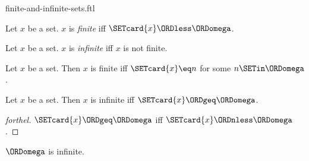 \documentclass{stex}
\begin{document}
\begin{smodule}{finite-and-infinite-sets.ftl}

\begin{definition}[forthel,id=SET_THEORY_07_5346658235711488]
  Let $x$ be a set.
  $x$ is \emph{finite} iff $\SETcard{x} \ORDless \ORDomega$.
\end{definition}

\begin{definition}[forthel,id=SET_THEORY_07_8295412068777984]
  Let $x$ be a set.
  $x$ is \emph{infinite} iff $x$ is not finite.
\end{definition}

\begin{proposition}[forthel,id=SET_THEORY_07_3806229474312192]
  Let $x$ be a set.
  Then $x$ is finite iff $\SETcard{x} \eq n$ for some $n \SETin \ORDomega$.
\end{proposition}

\begin{proposition}[forthel,id=SET_THEORY_07_3174577070931968]
  Let $x$ be a set.
  Then $x$ is infinite iff $\SETcard{x} \ORDgeq \ORDomega$.
\end{proposition}
\begin{proof}[forthel]
  $\SETcard{x} \ORDgeq \ORDomega$ iff $\SETcard{x} \ORDnless \ORDomega$.
\end{proof}

\begin{proposition}[forthel,id=SET_THEORY_07_9154385075632368]
  $\ORDomega$ is infinite.
\end{proposition}
\end{smodule}
\end{document}
